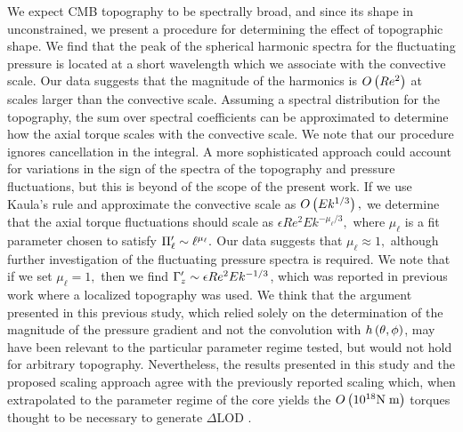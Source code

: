 We expect CMB topography to be spectrally broad, and since its shape in unconstrained, we present a procedure for determining the effect of topographic shape. We find that the peak of the spherical harmonic spectra for the fluctuating pressure is located at a short wavelength which we associate with the convective scale. 
Our data suggests that the magnitude of the harmonics is $O\left ( Re^{2}\right )$ at scales larger than the convective scale. 
Assuming a spectral distribution for the topography, the sum over spectral coefficients can be approximated to determine how the axial torque scales with the convective scale. 
We note that our procedure ignores cancellation in the integral. A more sophisticated approach could account for variations in the sign of the spectra of the topography and pressure fluctuations, but this is beyond of the scope of the present work. 
If we use Kaula's rule \citep{wK66} and approximate the convective scale as $O\left ( Ek^{1/3}\right ), $ we determine that the axial torque fluctuations should scale as $\epsilon  Re^{2}Ek^{-\mu_\ell/3},$ where $\mu_\ell$ is a fit parameter chosen to satisfy $\Pi^{\prime}_{\ell}\sim\ell^{\mu_\ell}.$ Our data suggests that $\mu_\ell\approx1,$ although further investigation of the fluctuating pressure spectra is required. We note that if we set $\mu_\ell = 1,$ then we find ${ {\Gamma}^{\prime}_z }\sim \epsilon Re^{2}Ek^{-1/3}$, which was reported in previous work where a localized topography was used. We think that the argument presented in this previous study, which relied solely on the determination of the magnitude of the pressure gradient and not the convolution with $h\left ( \theta,\phi\right ) $, may have been relevant to the particular parameter regime tested, but would not hold for arbitrary topography.
Nevertheless, the results presented in this study and the proposed scaling approach agree with the previously reported scaling which, when extrapolated to the parameter regime of the core yields the $O\left ( 10^{18}\text{N}\;\text{m}\right ) $ torques thought to be necessary to generate $\Delta$LOD \citep{tO25,HdV05}.




